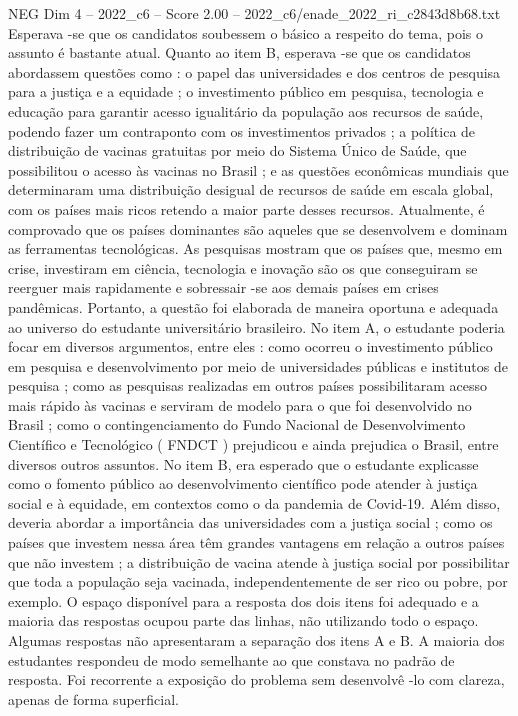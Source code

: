 \begin{textsample}{NEG Dim 4 – 2022\_c6 – Score 2.00 – 2022\_c6/enade\_2022\_ri\_c2843d8b68.txt}
Esperava -se que os candidatos soubessem o básico a respeito do tema, pois o assunto é bastante atual.
Quanto ao item B, esperava -se que os candidatos abordassem questões como : o papel das universidades e dos centros de pesquisa para a justiça e a equidade ; o investimento público em pesquisa, tecnologia e educação para garantir acesso igualitário da população aos recursos de saúde, podendo fazer um contraponto com os investimentos privados ; a política de distribuição de vacinas gratuitas por meio do Sistema Único de Saúde, que possibilitou o acesso às vacinas no Brasil ; e as questões econômicas mundiais que determinaram uma distribuição desigual de recursos de saúde em escala global, com os países mais ricos retendo a maior parte desses recursos.
Atualmente, é comprovado que os países dominantes são aqueles que se desenvolvem e dominam as ferramentas tecnológicas.
As pesquisas mostram que os países que, mesmo em crise, investiram em ciência, tecnologia e inovação são os que conseguiram se reerguer mais rapidamente e sobressair -se aos demais países em crises pandêmicas.
Portanto, a questão foi elaborada de maneira oportuna e adequada ao universo do estudante universitário brasileiro.
No item A, o estudante poderia focar em diversos argumentos, entre eles : como ocorreu o investimento público em pesquisa e desenvolvimento por meio de universidades públicas e institutos de pesquisa ; como as pesquisas realizadas em outros países possibilitaram acesso mais rápido às vacinas e serviram de modelo para o que foi desenvolvido no Brasil ; como o contingenciamento do Fundo Nacional de Desenvolvimento Científico e Tecnológico ( FNDCT ) prejudicou e ainda prejudica o Brasil, entre diversos outros assuntos.
No item B, era esperado que o estudante explicasse como o fomento público ao desenvolvimento científico pode atender à justiça social e à equidade, em contextos como o da pandemia de Covid-19.
Além disso, deveria abordar a importância das universidades com a justiça social ; como os países que investem nessa área têm grandes vantagens em relação a outros países que não investem ; a distribuição de vacina atende à justiça social por possibilitar que toda a população seja vacinada, independentemente de ser rico ou pobre, por exemplo.
O espaço disponível para a resposta dos dois itens foi adequado e a maioria das respostas ocupou parte das linhas, não utilizando todo o espaço.
Algumas respostas não apresentaram a separação dos itens A e B.
A maioria dos estudantes respondeu de modo semelhante ao que constava no padrão de resposta.
Foi recorrente a exposição do problema sem desenvolvê -lo com clareza, apenas de forma superficial.

\end{textsample}
